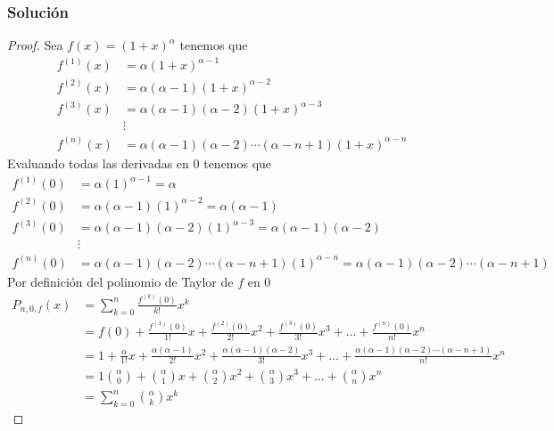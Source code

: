 \documentclass[a4paper]{article}
\begin{document}
\subsubsection*{Solución}
\begin{proof}
    Sea \(f(x) = \left(1 + x\right)^{\alpha}\) tenemos que 
    \begin{align*}
        f^{(1)}(x) &= \alpha\left(1 + x\right)^{\alpha - 1} \\
        f^{(2)}(x) &= \alpha\left(\alpha - 1\right)\left(1 + x\right)^{\alpha - 2} \\
        f^{(3)}(x) &= \alpha\left(\alpha - 1\right)\left(\alpha - 2\right)\left(1 + x\right)^{\alpha - 3} \\
        &\vdots \\
        f^{(n)}(x) &= \alpha\left(\alpha - 1\right)\left(\alpha - 2\right) \cdots \left(\alpha - n + 1\right)\left(1 + x\right)^{\alpha - n}
    \end{align*}
    Evaluando todas las derivadas en \(0\) tenemos que 
    \begin{align*}
        f^{(1)}(0) &= \alpha\left(1\right)^{\alpha - 1} = \alpha \\
        f^{(2)}(0) &= \alpha\left(\alpha - 1\right)\left(1\right)^{\alpha - 2} = \alpha\left(\alpha - 1\right) \\
        f^{(3)}(0) &= \alpha\left(\alpha - 1\right)\left(\alpha - 2\right)\left(1\right)^{\alpha - 3} = \alpha\left(\alpha - 1\right)\left(\alpha - 2\right) \\
        &\vdots \\
        f^{(n)}(0) &= \alpha\left(\alpha - 1\right)\left(\alpha - 2\right) \cdots \left(\alpha - n + 1\right)\left(1\right)^{\alpha - n} = \alpha\left(\alpha - 1\right)\left(\alpha - 2\right) \cdots \left(\alpha - n + 1\right)
    \end{align*}
    Por definición del polinomio de Taylor de \(f\) en \(0\)
    \begin{align*}
        P_{n, 0, f}(x) &= \sum_{k = 0}^{n} \frac{f^{(k)}(0)}{k!}x^k \\
        &= f(0) + \frac{f^{(1)}(0)}{1!}x + \frac{f^{(2)}(0)}{2!}x^2 + \frac{f^{(3)}(0)}{3!}x^3 + \dotsc + \frac{f^{(n)}(0)}{n!}x^n \\
        &= 1 + \frac{\alpha}{1!}x + \frac{\alpha\left(\alpha - 1\right)}{2!}x^2 + \frac{\alpha\left(\alpha - 1\right)\left(\alpha - 2\right)}{3!}x^3 + \dotsc + \frac{\alpha\left(\alpha - 1\right)\left(\alpha - 2\right) \cdots \left(\alpha - n + 1\right)}{n!}x^n \\
        &= 1\binom{\alpha}{0} + \binom{\alpha}{1}x + \binom{\alpha}{2}x^2 + \binom{\alpha}{3}x^3 + \dotsc + \binom{\alpha}{n}x^n \\
        &= \sum_{k = 0}^{n} \binom{\alpha}{k}x^{k}
    \end{align*}
\end{proof}
\newpage
\end{document}
